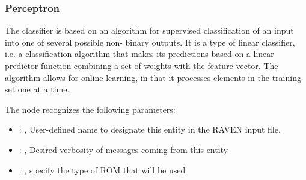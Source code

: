 \subsubsection{Perceptron}
  The  classifier is based on an                         algorithm for
  supervised classification of                         an input into one of several possible non-
  binary outputs.                         It is a type of linear classifier, i.e. a classification
  algorithm that makes                         its predictions based on a linear predictor function
  combining a set of weights                         with the feature vector.
  The algorithm allows for online learning, in that it processes elements in the
  training set one at a time.                         

  The  node recognizes the following parameters:
    \begin{itemize}
      \item {}: , 
        User-defined name to designate this entity in the RAVEN input file.
      \item {}: , 
        Desired verbosity of messages coming from this entity
      \item {}: , 
        specify the type of ROM that will be used
  \end{itemize}

